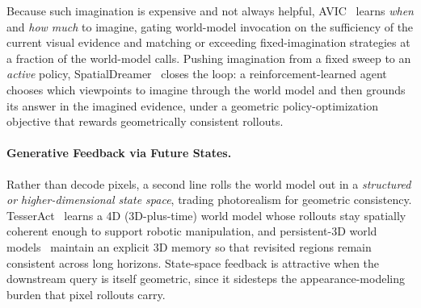 Because such imagination is expensive and not always helpful, AVIC~\cite{yu2026avic} learns \emph{when} and \emph{how much} to imagine, gating world-model invocation on the sufficiency of the current visual evidence and matching or exceeding fixed-imagination strategies at a fraction of the world-model calls.
Pushing imagination from a fixed sweep to an \emph{active} policy, SpatialDreamer~\cite{cao2025spatialdreamer} closes the loop: a reinforcement-learned agent chooses which viewpoints to imagine through the world model and then grounds its answer in the imagined evidence, under a geometric policy-optimization objective that rewards geometrically consistent rollouts.

\paragraph{Generative Feedback via Future States.}
Rather than decode pixels, a second line rolls the world model out in a \emph{structured or higher-dimensional state space}, trading photorealism for geometric consistency.
TesserAct~\cite{zhen2025tesseract} learns a 4D (3D-plus-time) world model whose rollouts stay spatially coherent enough to support robotic manipulation, and persistent-3D world models~\cite{zhou2025learning} maintain an explicit 3D memory so that revisited regions remain consistent across long horizons.
State-space feedback is attractive when the downstream query is itself geometric, since it sidesteps the appearance-modeling burden that pixel rollouts carry.


